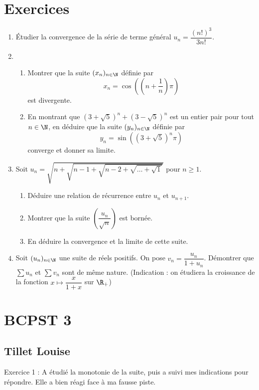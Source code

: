 \documentclass{article}
\begin{document}
\section{Exercices}
\begin{enumerate}
\item Étudier la convergence de la série de terme général $u_n = \dfrac{(n!)^3}{3n!}$.
\item 
\begin{enumerate}[label=\emph{\alph*)}]
\item Montrer que la suite $(x_n)_{n \in \N}$ définie par
\begin{equation*}
x_n = \cos\left(\left(n + \dfrac{1}{n}\right)\pi\right)
\end{equation*}
est divergente.
\item En montrant que $\left(3 + \sqrt{5}\right)^n + \left(3 - \sqrt{5}\right)^n$ est un entier pair pour tout $n \in \N$, en déduire que la suite $(y_n)_{n \in \N}$ définie par
\begin{equation*}
y_n = \sin\left(\left(3 + \sqrt{5}\right)^n \pi \right)
\end{equation*}
converge et donner sa limite.
\end{enumerate}
\item Soit $u_n = \sqrt{n + \sqrt{n - 1 + \sqrt{n - 2 + \sqrt{\dots + \sqrt{1}}}}}$ pour $n \geq 1$.
\begin{enumerate}[label=\emph{\alph*)}]
\item Déduire une relation de récurrence entre $u_n$ et $u_{n+1}$.
\item Montrer que la suite $\left(\dfrac{u_n}{\sqrt{n}}\right)$ est bornée.
\item En déduire la convergence et la limite de cette suite. 
\end{enumerate}
\item Soit $(u_n)_{n \in \N}$ une suite de réels positifs. On pose $v_n = \dfrac{u_n}{1 + u_n}$. Démontrer que $\sum u_n$ et $\sum v_n$ sont de même nature. (Indication : on étudiera la croissance de la fonction $x \mapsto \dfrac{x}{1+x}$ sur $\R_+$)
\end{enumerate}
\section{BCPST 3} 
\subsection{Tillet Louise}
Exercice 1 : A étudié la monotonie de la suite, puis a suivi mes indications pour répondre. Elle a bien réagi face à ma fausse piste.
\end{document}

